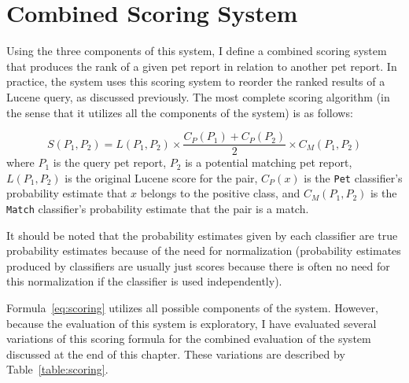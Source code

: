 \section {Combined Scoring System}

Using the three components of this system, I define a combined scoring system that produces the rank of a given pet report in relation to another pet report.  In practice, the system uses this scoring system to reorder the ranked results of a Lucene query, as discussed previously.  The most complete scoring algorithm (in the sense that it utilizes all the components of the system) is as follows:

\begin {equation}
S(P_1, P_2) = L(P_1, P_2) \times \frac{C_P(P_1) + C_P(P_2)}{2} \times C_M(P_1, P_2)
\label{eq:scoring}
\end {equation}
where $P_1$ is the query pet report, $P_2$ is a potential matching pet report, $L(P_1, P_2)$ is the original Lucene score for the pair, $C_P(x)$ is the {\tt Pet} classifier's probability estimate that $x$ belongs to the positive class, and $C_M(P_1, P_2)$ is the {\tt Match} classifier's probability estimate that the pair is a match.

It should be noted that the probability estimates given by each classifier are true probability estimates because of the need for normalization (probability estimates produced by classifiers are usually just scores because there is often no need for this normalization if the classifier is used independently). 

Formula~\ref{eq:scoring} utilizes all possible components of the system.  However, because the evaluation of this system is exploratory, I have evaluated several variations of this scoring formula for the combined evaluation of the system discussed at the end of this chapter.  These variations are described by Table~\ref{table:scoring}.

